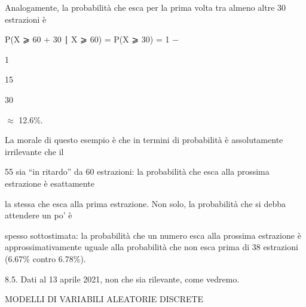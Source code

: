 \documentclass[a4paper,portrait,12pt]{article}
\begin{document}
\begin{flushleft}
Analogamente, la probabilit\`{a} che esca per la prima volta tra almeno altre 30 estrazioni \`{e}
\end{flushleft}


\begin{flushleft}
P(X ⩾ 60 + 30 ∣ X ⩾ 60) = P(X ⩾ 30) = 1 $-$
\end{flushleft}





1


15





30





$\approx$ 12.6\%.





\begin{flushleft}
La morale di questo esempio \`{e} che in termini di probabilit\`{a} \`{e} assolutamente irrilevante che il
\end{flushleft}


\begin{flushleft}
55 sia {``}in ritardo'' da 60 estrazioni: la probabilit\`{a} che esca alla prossima estrazione \`{e} esattamente
\end{flushleft}


\begin{flushleft}
la stessa che esca alla prima estrazione. Non solo, la probabilit\`{a} che si debba attendere un po' \`{e}
\end{flushleft}


\begin{flushleft}
spesso sottostimata: la probabilit\`{a} che un numero esca alla prossima estrazione \`{e} approssimativamente uguale alla probabilit\`{a} che non esca prima di 38 estrazioni (6.67\% contro 6.78\%).
\end{flushleft}


\begin{flushleft}
8.5. Dati al 13 aprile 2021, non che sia rilevante, come vedremo.
\end{flushleft}










\begin{flushleft}
MODELLI DI VARIABILI ALEATORIE DISCRETE
\end{flushleft}
\end{document}
